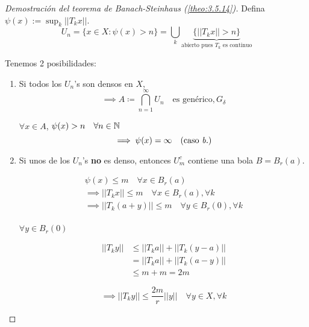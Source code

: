 \begin{proof}[Demostración del teorema de Banach-Steinhaus (\ref{theo:3.5.14})]
    Defina $\psi(x):=\sup_k ||T_k x||$.
    \[U_n=\{x\in X:\psi(x)>n\}=\bigcup_{k} \underbrace{\{||T_k x|| > n\}}_{\text{abierto pues $T_k$ es continuo}}\]

    Tenemos 2 posibilidades:

    \begin{enumerate}
        \item Si todos los $U_n$'s son densos en $X$,
        \[\implies A\coloneqq \bigcap_{n=1}^\infty U_n \quad \text{es genérico},G_\delta\]

        $\forall x\in A$, $\psi(x)>n\quad \forall n\in\mathbb{N}$
        \[\implies \psi(x)=\infty\quad \text{(caso \emph{b.})}\]

        \item Si unos de los $U_n$'s \textbf{no} es denso, entonces $U_m^c$ contiene una bola $B=B_r(a)$.
        
        \begin{align*}
            \psi(x)\leq m\quad \forall x\in B_r(a)\\
            \implies ||T_k x||\leq m\quad \forall x\in B_r(a),\forall k\\
            \implies ||T_k(a+y)||\leq m\quad \forall y\in B_r(0),\forall k\\
        \end{align*}

        $\forall y\in B_r(0)$

        \begin{align*}
            ||T_k y||&\leq ||T_k a||+||T_k(y-a)||\\
            &=||T_k a||+||T_k(a-y)||\\
            &\leq m + m = 2m
        \end{align*}

        \[\implies ||T_k y||\leq \frac{2m}{r}||y||\quad \forall y\in X,\forall k\]
    \end{enumerate}
\end{proof}


